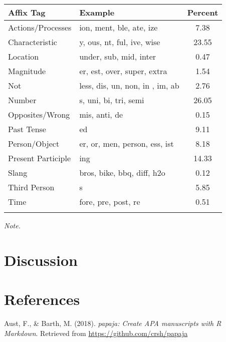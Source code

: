 \documentclass[english,man]{apa6}
\theoremstyle{definition}
\theoremstyle{definition}
\theoremstyle{definition}
\theoremstyle{remark}
\begin{document}
\begin{table}[tbp]
\begin{center}
\begin{threeparttable}
\caption{\label{tab:unnamed-chunk-7}}
\begin{tabular}{llc}
\toprule
Affix Tag & Example & Percent\\
\midrule
Actions/Processes & ion, ment, ble, ate, ize & 7.38\\
Characteristic & y, ous, nt, ful, ive, wise & 23.55\\
Location & under, sub, mid, inter & 0.47\\
Magnitude & er, est, over, super, extra & 1.54\\
Not & less, dis, un, non, in , im, ab & 2.76\\
Number & s, uni, bi, tri, semi & 26.05\\
Opposites/Wrong & mis, anti, de & 0.15\\
Past Tense & ed & 9.11\\
Person/Object & er, or, men, person, ess, ist & 8.18\\
Present Participle & ing & 14.33\\
Slang & bros, bike, bbq, diff, h2o & 0.12\\
Third Person & s & 5.85\\
Time & fore, pre, post, re & 0.51\\
\bottomrule
\addlinespace
\end{tabular}
\begin{tablenotes}[para]
\textit{Note.} 
\end{tablenotes}
\end{threeparttable}
\end{center}
\end{table}

\section{Discussion}\label{discussion}

\newpage

\section{References}\label{references}

\setlength{\parindent}{-0.5in} \setlength{\leftskip}{0.5in}

\hypertarget{refs}{}
\hypertarget{ref-R-papaja}{}
Aust, F., \& Barth, M. (2018). \emph{papaja: Create APA manuscripts with
R Markdown}. Retrieved from \url{https://github.com/crsh/papaja}
\end{document}
